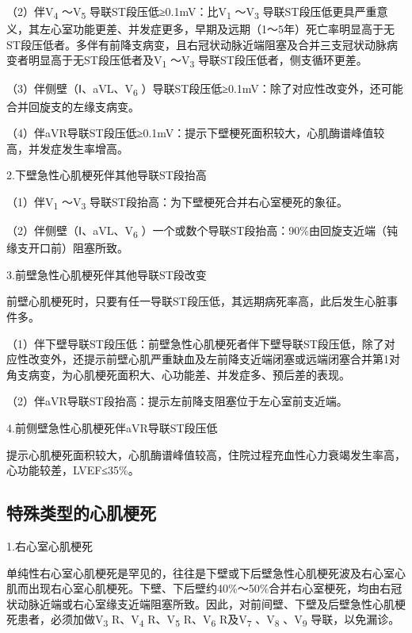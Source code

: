 （2）伴V\textsubscript{4} ～V\textsubscript{5}
导联ST段压低≥0.1mV：比V\textsubscript{1} ～V\textsubscript{3}
导联ST段压低更具严重意义，其左心室功能更差、并发症更多，早期及远期（1～5年）死亡率明显高于无ST段压低者。多伴有前降支病变，且右冠状动脉近端阻塞及合并三支冠状动脉病变者明显高于无ST段压低者及V\textsubscript{1}
～V\textsubscript{3} 导联ST段压低者，侧支循环更差。

（3）伴侧壁（Ⅰ、aVL、V\textsubscript{6}
）导联ST段压低≥0.1mV：除了对应性改变外，还可能合并回旋支的左缘支病变。

（4）伴aVR导联ST段压低≥0.1mV：提示下壁梗死面积较大，心肌酶谱峰值较高，并发症发生率增高。

2.下壁急性心肌梗死伴其他导联ST段抬高

（1）伴V\textsubscript{1} ～V\textsubscript{3}
导联ST段抬高：为下壁梗死合并右心室梗死的象征。

（2）伴侧壁（Ⅰ、aVL、V\textsubscript{6}
）一个或数个导联ST段抬高：90\%由回旋支近端（钝缘支开口前）阻塞所致。

3.前壁急性心肌梗死伴其他导联ST段改变

前壁心肌梗死时，只要有任一导联ST段压低，其远期病死率高，此后发生心脏事件多。

（1）伴下壁导联ST段压低：前壁急性心肌梗死者伴下壁导联ST段压低，除了对应性改变外，还提示前壁心肌严重缺血及左前降支近端闭塞或远端闭塞合并第1对角支病变，为心肌梗死面积大、心功能差、并发症多、预后差的表现。

（2）伴aVR导联ST段抬高：提示左前降支阻塞位于左心室前支近端。

4.前侧壁急性心肌梗死伴aVR导联ST段压低

提示心肌梗死面积较大，心肌酶谱峰值较高，住院过程充血性心力衰竭发生率高，心功能较差，LVEF≤35\%。

\protect\hypertarget{text00052.htmlux5cux23subid628}{}{}

\subsection{特殊类型的心肌梗死}

1.右心室心肌梗死

单纯性右心室心肌梗死是罕见的，往往是下壁或下后壁急性心肌梗死波及右心室心肌而出现右心室心肌梗死。下壁、下后壁约40\%～50\%合并右心室梗死，均由右冠状动脉近端或右心室缘支近端阻塞所致。因此，对前间壁、下壁及后壁急性心肌梗死患者，必须加做V\textsubscript{3}
R、V\textsubscript{4} R、V\textsubscript{5} R、V\textsubscript{6}
R及V\textsubscript{7} 、V\textsubscript{8} 、V\textsubscript{9}
导联，以免漏诊。

